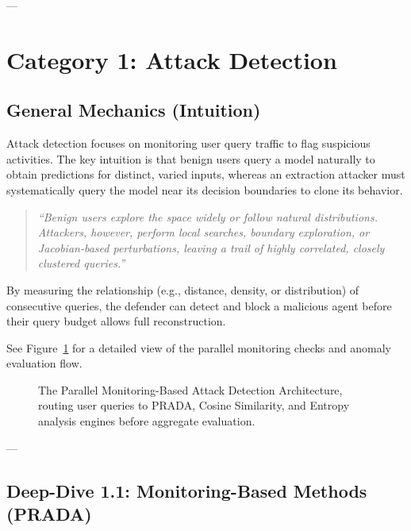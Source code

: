 \documentclass{article}
\begin{document}
---

\section{Category 1: Attack Detection}

\subsection{General Mechanics (Intuition)}
Attack detection focuses on monitoring user query traffic to flag suspicious activities. The key intuition is that benign users query a model naturally to obtain predictions for distinct, varied inputs, whereas an extraction attacker must systematically query the model near its decision boundaries to clone its behavior.

\begin{quote}
    \textit{``Benign users explore the space widely or follow natural distributions. Attackers, however, perform local searches, boundary exploration, or Jacobian-based perturbations, leaving a trail of highly correlated, closely clustered queries.''}
\end{quote}

By measuring the relationship (e.g., distance, density, or distribution) of consecutive queries, the defender can detect and block a malicious agent before their query budget allows full reconstruction.

See Figure~\ref{fig:monitoring_pipeline} for a detailed view of the parallel monitoring checks and anomaly evaluation flow.

\begin{figure}[htbp]
    \centering
    \caption{The Parallel Monitoring-Based Attack Detection Architecture, routing user queries to PRADA, Cosine Similarity, and Entropy analysis engines before aggregate evaluation.}
    \label{fig:monitoring_pipeline}
\end{figure}

---

\subsection{Deep-Dive 1.1: Monitoring-Based Methods (PRADA)}
\end{document}
